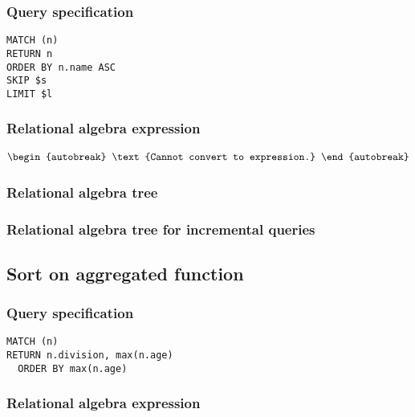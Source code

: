 \subsubsection*{Query specification}

\begin{lstlisting}
MATCH (n)
RETURN n
ORDER BY n.name ASC
SKIP $s
LIMIT $l
\end{lstlisting}

\subsubsection*{Relational algebra expression}

\begin{align*}
\begin{autobreak}
\text{Cannot convert to expression.}
\end{autobreak}
\end{align*}

\subsubsection*{Relational algebra tree}


\subsubsection*{Relational algebra tree for incremental queries}


\subsection{Sort on aggregated function}

\subsubsection*{Query specification}

\begin{lstlisting}
MATCH (n)
RETURN n.division, max(n.age)
  ORDER BY max(n.age)
\end{lstlisting}

\subsubsection*{Relational algebra expression}


